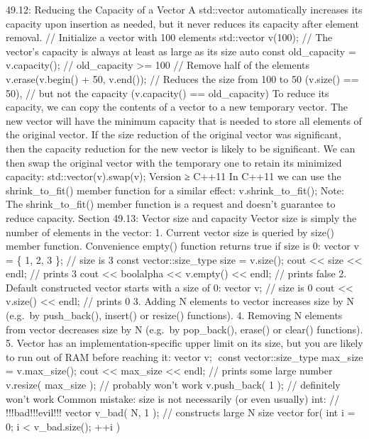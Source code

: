49.12: Reducing the Capacity of a Vector A std::vector automatically
increases its capacity upon insertion as needed, but it never reduces
its capacity after element removal. // Initialize a vector with 100
elements std::vector v(100); // The vector's capacity is always at least
as large as its size auto const old\_capacity = v.capacity(); //
old\_capacity \textgreater= 100 // Remove half of the elements
v.erase(v.begin() + 50, v.end()); // Reduces the size from 100 to 50
(v.size() == 50), // but not the capacity (v.capacity() ==
old\_capacity) To reduce its capacity, we can copy the contents of a
vector to a new temporary vector. The new vector will have the minimum
capacity that is needed to store all elements of the original vector. If
the size reduction of the original vector was signiﬁcant, then the
capacity reduction for the new vector is likely to be signiﬁcant. We can
then swap the original vector with the temporary one to retain its
minimized capacity: std::vector(v).swap(v); Version ≥ C++11 In C++11 we
can use the shrink\_to\_fit() member function for a similar eﬀect:
v.shrink\_to\_fit(); Note: The shrink\_to\_fit() member function is a
request and doesn't guarantee to reduce capacity. Section 49.13: Vector
size and capacity Vector size is simply the number of elements in the
vector: 1. Current vector size is queried by size() member function.
Convenience empty() function returns true if size is 0: vector v = \{ 1,
2, 3 \}; // size is 3 const vector::size\_type size = v.size(); cout
\textless\textless{} size \textless\textless{} endl; // prints 3 cout
\textless\textless{} boolalpha \textless\textless{} v.empty()
\textless\textless{} endl; // prints false 2. Default constructed vector
starts with a size of 0: vector v; // size is 0 cout
\textless\textless{} v.size() \textless\textless{} endl; // prints 0 3.
Adding N elements to vector increases size by N (e.g.~by push\_back(),
insert() or resize() functions). 4. Removing N elements from vector
decreases size by N (e.g.~by pop\_back(), erase() or clear() functions).
5. Vector has an implementation-speciﬁc upper limit on its size, but you
are likely to run out of RAM before reaching it: vector v; const
vector::size\_type max\_size = v.max\_size(); cout \textless\textless{}
max\_size \textless\textless{} endl; // prints some large number
v.resize( max\_size ); // probably won't work v.push\_back( 1 ); //
definitely won't work Common mistake: size is not necessarily (or even
usually) int: // !!!bad!!!evil!!! vector v\_bad( N, 1 ); // constructs
large N size vector for( int i = 0; i \textless{} v\_bad.size(); ++i )
